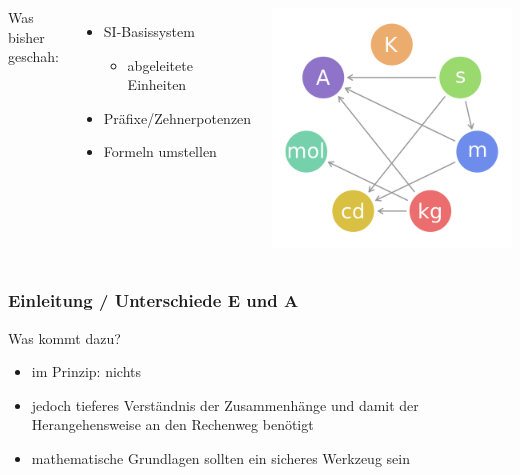 \begin{frame}
    \begin{columns}[c]
        \column[c]{5cm}
            Was bisher geschah: \\[1em]
            \begin{itemize}
                \item SI-Basissystem
                \begin{itemize}
                    \item abgeleitete Einheiten
                \end{itemize}
                \item Präfixe/Zehnerpotenzen
                \item Formeln umstellen
            \end{itemize}
        \column{5cm}
            \begin{center}
                \includegraphics[width=1\textwidth]{e01/SI_base_unit.png}
                \tiny \hyperlink{refs}{\cite{wc}}
            \end{center}
    \end{columns}

\end{frame}

\begin{frame}
    \frametitle{Einleitung / Unterschiede E und A}

    Was kommt dazu? \\[1em]

    \begin{itemize}
        \item im Prinzip: nichts
        \item jedoch tieferes Verständnis der Zusammenhänge und damit der
              Herangehensweise an den Rechenweg benötigt
        \item mathematische Grundlagen sollten ein sicheres Werkzeug sein
    \end{itemize}

\end{frame}

